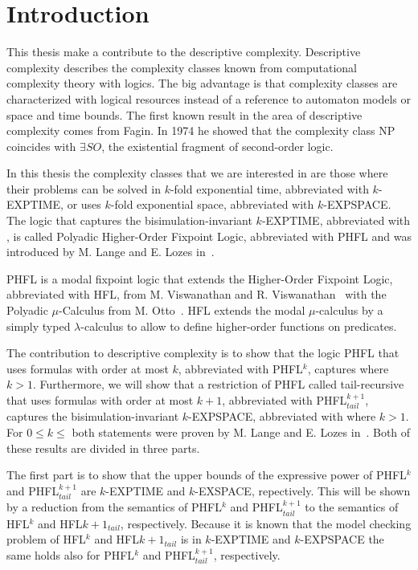 \chapter{Introduction}\label{ch:introduction}

This thesis make a contribute to the descriptive complexity. Descriptive complexity describes the complexity classes known from computational complexity theory with logics. The big advantage is that complexity classes are characterized with logical resources instead of a reference to automaton models or space and time bounds. The first known result in the area of descriptive complexity comes from Fagin. In 1974 he showed that the complexity class NP coincides with $\exists SO$, the existential fragment of second-order logic. 

In this thesis the complexity classes that we are interested in are those where their problems can be solved in $k$-fold exponential time, abbreviated with $k$-EXPTIME, or uses $k$-fold exponential space, abbreviated with $k$-EXPSPACE. The logic that captures the bisimulation-invariant $k$-EXPTIME, abbreviated with , is called Polyadic Higher-Order Fixpoint Logic, abbreviated with PHFL and was introduced by M. Lange and E. Lozes in~\cite{lange2014capturing}. 

PHFL is a modal fixpoint logic that extends the Higher-Order Fixpoint Logic, abbreviated with HFL, from M. Viswanathan and R. Viswanathan~\cite{viswanathan2004higher} with the Polyadic $\mu$-Calculus from M. Otto~\cite{otto1999bisimulation}. HFL extends the modal $\mu$-calculus by a simply typed $\lambda$-calculus to allow to define higher-order functions on predicates.

The contribution to descriptive complexity is to show that the logic PHFL that uses formulas with order at most $k$, abbreviated with PHFL$^k$, captures  where $k > 1$.  Furthermore, we will show that a restriction of PHFL called tail-recursive that uses formulas with order at most $k+1$, abbreviated with PHFL$^{k+1}_{tail}$, captures the bisimulation-invariant $k$-EXPSPACE, abbreviated with  where $k > 1$. For $0 \leq k \leq$ both statements were proven by M. Lange and E. Lozes in~\cite{lange2014capturing}. Both of these results are divided in three parts. 

The first part is to show that the upper bounds of the expressive power of PHFL$^k$ and PHFL$^{k+1}_{tail}$ are $k$-EXPTIME and $k$-EXSPACE, repectively. This will be shown by a reduction from the semantics of PHFL$^k$ and PHFL$^{k+1}_{tail}$ to the semantics of HFL$^k$ and HFL${k+1}_{tail}$, respectively. Because it is known that the model checking problem of HFL$^k$ and HFL${k+1}_{tail}$ is in $k$-EXPTIME and $k$-EXPSPACE the same holds also for PHFL$^k$ and PHFL$^{k+1}_{tail}$, respectively.

